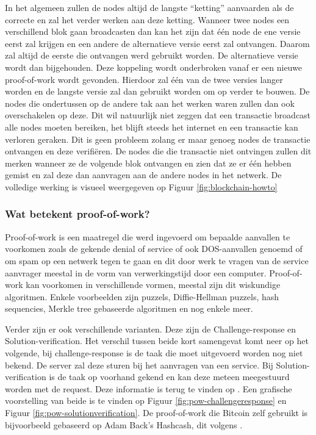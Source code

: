 In het algemeen zullen de nodes altijd de langste ``ketting'' aanvaarden als de correcte en zal het verder werken aan deze ketting. Wanneer twee nodes een verschillend blok gaan broadcasten dan kan het zijn dat één node de ene versie eerst zal krijgen en een andere de alternatieve versie eerst zal ontvangen. Daarom zal altijd de eerste die ontvangen werd gebruikt worden. De alternatieve versie wordt dan bijgehouden. Deze koppeling wordt onderbroken vanaf er een nieuwe proof-of-work wordt gevonden. Hierdoor zal één van de twee versies langer worden en de langste versie zal dan gebruikt worden om op verder te bouwen. De nodes die ondertussen op de andere tak aan het werken waren zullen dan ook overschakelen op deze. Dit wil natuurlijk niet zeggen dat een transactie broadcast alle nodes moeten bereiken, het blijft steeds het internet en een transactie kan verloren geraken. Dit is geen probleem zolang er maar genoeg nodes de transactie ontvangen en deze verifiëren. De nodes die die transactie niet ontvingen zullen dit merken wanneer ze de volgende blok ontvangen en zien dat ze er één hebben gemist en zal deze dan aanvragen aan de andere nodes in het netwerk. De volledige werking is visueel weergegeven op Figuur \ref{fig:blockchain-howto}

\subsubsection{Wat betekent proof-of-work?}
Proof-of-work is een maatregel die werd ingevoerd om bepaalde aanvallen te voorkomen zoals de gekende denial of service of ook DOS-aanvallen genoemd of om spam op een netwerk tegen te gaan en dit door werk te vragen van de service aanvrager meestal in de vorm van verwerkingstijd door een computer. Proof-of-work kan voorkomen in verschillende vormen, meestal zijn dit wiskundige algoritmen. Enkele voorbeelden zijn puzzels, Diffie-Hellman puzzels, hash sequencies, Merkle tree gebaseerde algoritmen en nog enkele meer. 

Verder zijn er ook verschillende varianten. Deze zijn de Challenge-response en Solution-verification. Het verschil tussen beide kort samengevat komt neer op het volgende, bij challenge-response is de taak die moet uitgevoerd worden nog niet bekend. De server zal deze sturen bij het aanvragen van een service. Bij Solution-verification is de taak op voorhand gekend en kan deze meteen meegestuurd worden met de request. Deze informatie is terug te vinden op  \textcite{Wikipedia-POW}. Een grafische voorstelling van beide is te vinden op Figuur \ref{fig:pow-challengeresponse} en Figuur \ref{fig:pow-solutionverification}. De proof-of-work die Bitcoin zelf gebruikt is bijvoorbeeld gebaseerd op Adam Back's Hashcash, dit volgens \textcite{Nakamoto2008}.

